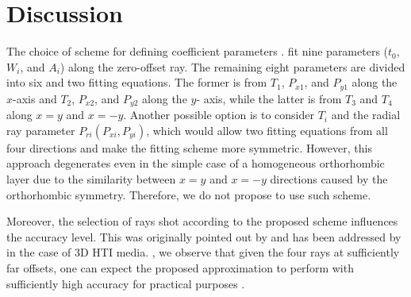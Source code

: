 \section{Discussion}



The choice of scheme for defining coefficient parameters .  fit nine parameters ($t_0$, $W_i$, and $A_i$) along the zero-offset ray. The remaining eight parameters are divided into six and two fitting equations. The former is from $T_1$, $P_{x1}$, and $P_{y1}$ along the $x$-axis and $T_2$, $P_{x2}$, and $P_{y2}$ along the $y$- axis, while the latter is from $T_3$ and $T_4$ along $x=y$ and $x=-y$. Another possible option is to consider $T_i$ and the radial ray parameter $P_{ri}(P_{xi},P_{yi})$, which would allow two fitting equations from all four directions and make the fitting scheme more symmetric. However, this approach degenerates even in the simple case of a homogeneous orthorhombic layer due to the similarity between $x=y$ and $x=-y$ directions caused by the orthorhombic symmetry. Therefore, we do not propose to use such scheme. 

Moreover, the selection of  rays shot according to the proposed scheme  influences the accuracy level. This  was originally pointed out by \cite{fomelstovas} and has been addressed by \cite{haogma} in the case of 3D HTI media. , we observe that given the four rays at sufficiently far offsets, one can expect the proposed approximation to perform with sufficiently high accuracy for practical purposes . 

